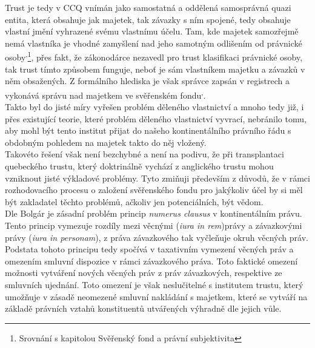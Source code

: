 \documentclass{article}
\begin{document}
Trust je tedy v CCQ vnímán jako samostatná a oddělená samosprávná quazi entita, která obsahuje jak majetek, tak závazky s ním spojené, tedy obsahuje vlastní jmění vyhrazené svému vlastnímu účelu. Tam, kde majetek samozřejmě nemá vlastníka je vhodné zamyšlení nad jeho samotným odlišením od právnické osoby\textsuperscript{,}\footnote{Srovnání s kapitolou Svěřenský fond a právní subjektivita}, přes fakt, že zákonodárce nezavedl pro trust klasifikaci právnické osoby, tak trust tímto způsobem funguje, neboť je sám vlastníkem majetku a závazků v něm obsažených. Z formálního hlediska je však správce zapsán v registrech a vykonává správu nad majetkem ve svěřenském fondu\textsuperscript{,}.\\

Takto byl do jisté míry vyřešen problém děleného vlastnictví a mnoho tedy již, i přes existující teorie, které problém děleného vlastnictví vyvrací, nebránilo tomu, aby mohl být tento institut přijat do našeho kontinentálního právního řádu s obdobným pohledem na majetek takto do něj vložený.\\

Takovéto řešení však není bezchybné a není na podivu, že při transplantaci quebeckého trustu, který doktrinálně vychází z anglického trustu mohou vzniknout jisté výkladové problémy. Tyto zmiňuji především z důvodů, že v rámci rozhodovacího procesu o založení svěřenského fondu pro jakýkoliv účel by si měl být zakladatel těchto problémů, ačkoliv jen potenciálních, být vědom.\\

Dle Bolgár je zásadní problém princip \textit{numerus clausus} v kontinentálním právu. Tento princip vymezuje rozdíly mezi věcnými (\textit{iura in rem})právy a závazkovými právy (\textit{iura in personam}), z práva závazkového tak vyčleňuje okruh věcných práv. Podstata tohoto principu tedy spočívá v taxativním vymezení věcných práv a omezením smluvní dispozice v rámci závazkového práva. Toto faktické omezení možnosti vytváření nových věcných práv z práv závazkových, respektive ze smluvních ujednání. Toto omezení je však neslučitelné s institutem trustu, který umožňuje v zásadě neomezené smluvní nakládání s majetkem, které se vytváří na základě právních vztahů konstituentů utvářených výhradně dle jejich vůle.\\
\end{document}

